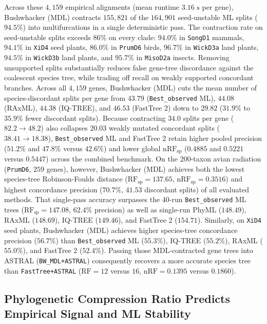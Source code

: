 \documentclass[11pt,a4paper]{article}
\begin{document}
Across these $4,159$ empirical alignments (mean runtime $3.16\text{ s}$ per gene), Bushwhacker (MDL) contracts $155,821$ of the $164,901$ seed-unstable ML splits ($94.5\%$) into multifurcations in a single deterministic pass. The contraction rate on seed-unstable splits exceeds $86\%$ on every clade: $94.0\%$ in \texttt{SongD1} mammals, $94.1\%$ in \texttt{XiD4} seed plants, $86.0\%$ in \texttt{PrumD6} birds, $96.7\%$ in \texttt{WickD3a} land plants, $94.5\%$ in \texttt{WickD3b} land plants, and $95.7\%$ in \texttt{MisoD2a} insects. Removing unsupported splits substantially reduces false gene-tree discordance against the coalescent species tree, while trading off recall on weakly supported concordant branches. Across all $4,159$ genes, Bushwhacker (MDL) cuts the mean number of species-discordant splits per gene from $43.79$ (\texttt{Best\_observed} ML), $44.08$ (RAxML), $44.38$ (IQ-TREE), and $46.53$ (FastTree 2) down to $29.82$ ($31.9\%$ to $35.9\%$ fewer discordant splits). Because contracting $34.0$ splits per gene ($82.2 \to 48.2$) also collapses $20.03$ weakly mutated concordant splits ($38.41 \to 18.38$), \texttt{Best\_observed} ML and FastTree 2 retain higher pooled precision ($51.2\%$ and $47.8\%$ versus $42.6\%$) and lower global $\text{nRF}_{\text{sp}}$ ($0.4885$ and $0.5221$ versus $0.5447$) across the combined benchmark. On the 200-taxon avian radiation (\texttt{PrumD6}, $259$ genes), however, Bushwhacker (MDL) achieves both the lowest species-tree Robinson-Foulds distance ($\text{RF}_{\text{sp}} = 137.65$, $\text{nRF}_{\text{sp}} = 0.3516$) and highest concordance precision ($70.7\%$, $41.53$ discordant splits) of all evaluated methods. That single-pass accuracy surpasses the 40-run \texttt{Best\_observed} ML trees ($\text{RF}_{\text{sp}} = 147.08$, $62.4\%$ precision) as well as single-run PhyML ($148.49$), RAxML ($148.69$), IQ-TREE ($149.46$), and FastTree 2 ($154.71$). Similarly, on \texttt{XiD4} seed plants, Bushwhacker (MDL) achieves higher species-tree concordance precision ($56.7\%$) than \texttt{Best\_observed} ML ($55.3\%$), IQ-TREE ($55.2\%$), RAxML ($55.0\%$), and FastTree 2 ($52.4\%$). Passing those MDL-contracted gene trees into ASTRAL (\texttt{BW\_MDL+ASTRAL}) consequently recovers a more accurate species tree than \texttt{FastTree+ASTRAL} ($\text{RF} = 12$ versus $16$, $\text{nRF} = 0.1395$ versus $0.1860$).

\subsection{Phylogenetic Compression Ratio Predicts Empirical Signal and ML Stability}
\end{document}
